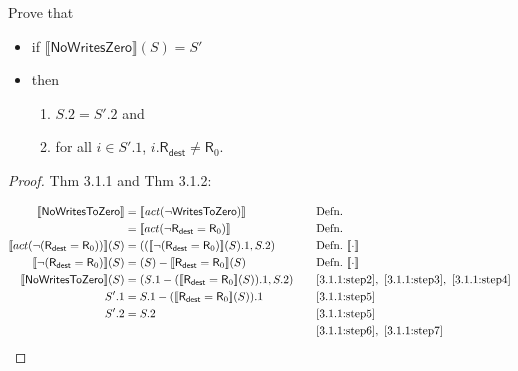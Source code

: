 \documentclass[12pt, letterpaper]{article}
\newcommand\interp[1]{\llbracket #1 \rrbracket}
\begin{document}
 Prove that
 \begin{itemize}
 \item  if
   $\interp{ \mathsf{NoWritesZero} } (S) =
   S'$
 \item then
   \begin{enumerate}
   \item $\mathit{S}.2 = \mathit{S'}.2$ and
   \item for all $i \in \mathit{S'}.1$, $i.\mathsf{R}_{\mathsf{dest}} \neq \mathsf{R}_0$.
   \end{enumerate}
 \end{itemize}
 \begin{proof}
 Thm 3.1.1 and Thm 3.1.2:
 \par\nobreak
 {\fontsize{10pt}{12pt}\selectfont
   \begin{alignat}{2}
     \setcounter{equation}{0}
     \label{3.1.1:step1}
     \interp{\mathsf{NoWritesToZero}}
     &= \interp{\mathit{act}(\neg \mathsf{WritesToZero})}
     &&\quad \text{Defn.}\\
     \label{3.1.1:step2}
     &= \interp{act(\neg \mathsf{R}_{\mathsf{dest}} = \mathsf{R}_0)}
     &&\quad \text{Defn.}\\
     \label{3.1.1:step3}
     \interp{act(\neg(\mathsf{R}_{\mathsf{dest}} = \mathsf{R}_0))}(S)
     &= ((\interp{\neg(\mathsf{R}_{\mathsf{dest}} = \mathsf{R}_0)}(S).1, S.2)
     &&\quad \text{Defn.}\ \interp{\cdot}\\    
     \label{3.1.1:step4}
     \interp{\neg(\mathsf{R}_{\mathsf{dest}} = \mathsf{R}_0)}(S)
     &= (S) - \interp{\mathsf{R}_{\mathsf{dest}} = \mathsf{R}_0}(S)
     &&\quad \text{Defn.}\ \interp{\cdot}\\    
     \label{3.1.1:step5}
     \interp{\mathsf{NoWritesToZero}}(S)
     &= (\mathit{S}.1 - (\interp{\mathsf{R}_{\mathsf{dest}} = \mathsf{R}_0}(S)).1, S.2)
     &&\quad \ref{3.1.1:step2},\ \ref{3.1.1:step3},\ \ref{3.1.1:step4}\\
     \label{3.1.1:step6}
     S'.1 &= S.1 - (\interp{\mathsf{R}_{\mathsf{dest}} = \mathsf{R}_0}(S)).1
     &&\quad \ref{3.1.1:step5} \\
     \label{3.1.1:step7}
     S'.2 &= S.2
     &&\quad \ref{3.1.1:step5} \\
     \label{3.1.1:qed}
     &\qedhere
    &&\quad \ref{3.1.1:step6},\ \ref{3.1.1:step7}
   \end{alignat}
 }%
 \end{proof}
 
\end{document}
